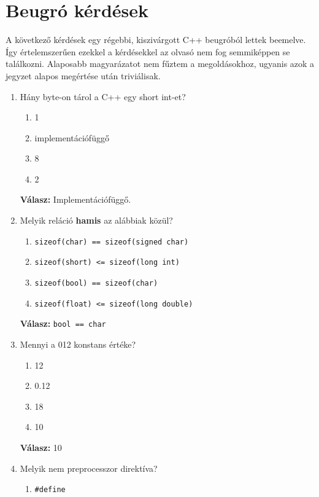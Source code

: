 \documentclass[../cpp_book/cpp_book.tex]{subfiles}
\begin{document}
	\section{Beugró kérdések}
	A következő kérdések egy régebbi, kiszivárgott C++ beugróból lettek beemelve. Így értelemszerűen ezekkel a kérdésekkel az olvasó nem fog semmiképpen se találkozni. Alaposabb magyarázatot nem fűztem a megoldásokhoz, ugyanis azok a jegyzet alapos megértése után triviálisak.
	\begin{enumerate}[1.)]
		\item  Hány byte-on tárol a C++ egy short int-et?
		\begin{enumerate}
			\item 1
			\item implementációfüggő
			\item 8
			\item 2
		\end{enumerate}
		\textbf{Válasz:} Implementációfüggő.
		\item Melyik reláció \textbf{hamis} az alábbiak közül?
		\begin{enumerate}
			\item \texttt{sizeof(char) == sizeof(signed char)}
			\item \texttt{sizeof(short) <= sizeof(long int)}
			\item \texttt{sizeof(bool) == sizeof(char)}
			\item \texttt{sizeof(float) <= sizeof(long double)}
		\end{enumerate}
		\textbf{Válasz:} \texttt{bool == char}
		\item Mennyi a 012 konstans értéke?
		\begin{enumerate}
			\item 12
			\item 0.12
			\item 18
			\item 10
		\end{enumerate}
		\textbf{Válasz:} 10
		\item Melyik nem preprocesszor direktíva?
		\begin{enumerate}
			\item \texttt{\#define}

\end{enumerate}
\end{enumerate}
\end{document}

